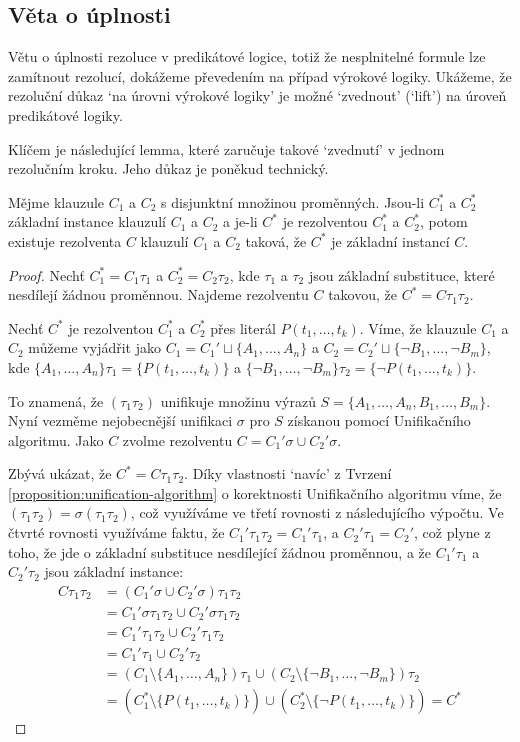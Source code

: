 \subsection{Věta o úplnosti}

Větu o úplnosti rezoluce v predikátové logice, totiž že nesplnitelné formule lze zamítnout rezolucí, dokážeme převedením na případ výrokové logiky. Ukážeme, že rezoluční důkaz `na úrovni výrokové logiky' je možné `zvednout' (`lift') na úroveň predikátové logiky.

Klíčem je následující lemma, které zaručuje takové `zvednutí' v jednom rezolučním kroku. Jeho důkaz je poněkud technický. 

\begin{lemma}\label{lemma:lifting-lemma}
Mějme klauzule $C_1$ a $C_2$ s disjunktní množinou proměnných. Jsou-li $C^*_1$ a $C^*_2$ základní instance klauzulí $C_1$ a $C_2$ a je-li $C^*$ je rezolventou $C^*_1$ a $C^*_2$, potom existuje rezolventa $C$ klauzulí $C_1$ a $C_2$ taková, že $C^*$ je základní instancí $C$.
\end{lemma}
\begin{proof}
Nechť $C^*_1=C_1\tau_1$ a $C^*_2=C_2\tau_2$, kde $\tau_1$ a $\tau_2$ jsou základní substituce, které nesdílejí žádnou proměnnou. Najdeme rezolventu $C$ takovou, že $C^*=C\tau_1\tau_2$.

Nechť $C^*$ je rezolventou $C_1^*$ a $C_2^*$ přes literál $P(t_1,\dots,t_k)$. Víme, že klauzule $C_1$ a $C_2$ můžeme vyjádřit jako $C_1=C_1' \sqcup \{A_1,\dots,A_n\}$ a $C_2=C_2' \sqcup \{\neg B_1,\dots,\neg B_m\}$, kde $\{A_1,\dots,A_n\}\tau_1=\{P(t_1,\dots,t_k)\}$ a $\{\neg B_1,\dots,\neg B_m\}\tau_2=\{\neg P(t_1,\dots,t_k)\}$.

To znamená, že $(\tau_1\tau_2)$ unifikuje množinu výrazů $S=\{A_1,\dots,A_n,B_1,\dots,B_m\}$. Nyní vezměme nejobecnější unifikaci $\sigma$ pro $S$ získanou pomocí Unifikačního algoritmu. Jako $C$ zvolme rezolventu $C=C_1'\sigma \cup C_2'\sigma$.

Zbývá ukázat, že $C^*=C\tau_1\tau_2$. Díky vlastnosti `navíc' z Tvrzení \ref{proposition:unification-algorithm} o korektnosti Unifikačního algoritmu víme, že $(\tau_1\tau_2)=\sigma(\tau_1\tau_2)$, což využíváme ve třetí rovnosti z následujícího výpočtu. Ve čtvrté rovnosti využíváme faktu, že $C_1'\tau_1\tau_2=C_1'\tau_1$, a $C_2'\tau_1=C_2'$, což plyne z toho, že jde o základní substituce nesdílející žádnou proměnnou, a že $C_1'\tau_1$ a $C_2'\tau_2$ jsou základní instance:
\begin{align*}
    C\tau_1\tau_2&= (C_1'\sigma \cup C_2'\sigma)\tau_1\tau_2\\
    &=C_1'\sigma\tau_1\tau_2 \cup C_2'\sigma\tau_1\tau_2\\
    &=C_1'\tau_1\tau_2 \cup C_2'\tau_1\tau_2\\
    &=C_1'\tau_1 \cup C_2'\tau_2\\
    &=(C_1\setminus\{A_1,\dots,A_n\})\tau_1\cup (C_2\setminus\{\neg B_1,\dots,\neg B_m\})\tau_2\\
    &=(C_1^*\setminus\{P(t_1,\dots,t_k)\})\cup(C_2^*\setminus \{\neg P(t_1,\dots,t_k)\})=C^*
\end{align*}
\end{proof}

